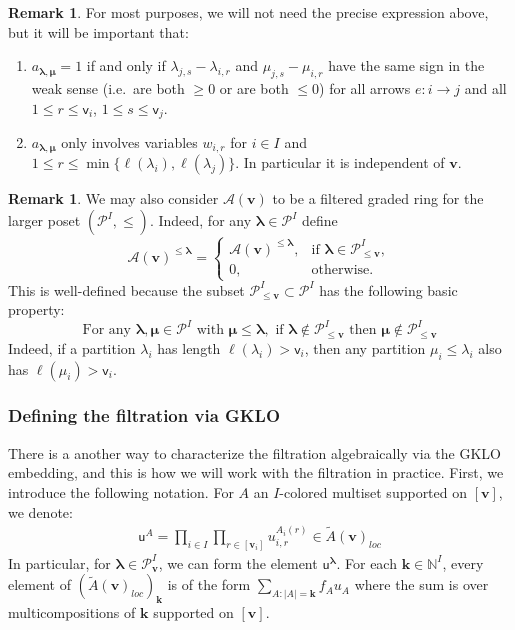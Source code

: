 \documentclass[11pt,reqno]{amsart}
\renewcommand{\mathbf}{\mathbold}
\numberwithin{equation}{section}
\theoremstyle{definition}
\newtheorem{Remark}[equation]{Remark}
\newcommand{\cA}{\mathcal{A}}
\newcommand{\cP}{\mathcal{P}}
\newcommand{\bk}{\mathbf{k}}
\newcommand{\bv}{\mathbf{v}}
\newcommand{\NN}{\mathbb{N}}
\renewcommand{\tilde}[1]{\widetilde{#1}}
\renewcommand{\bv}{\mathbf{v}} %
\newcommand{\sv}{\mathsf{v}}
\newcommand{\sfu}{\mathsf{u}}
\newcommand{\vertexset}{I}
\newcommand{\Partitions}{\cP}
\newcommand{\la}{\lambda}
\newcommand{\bla}{{\boldsymbol{\lambda}}}
\newcommand{\bmu}{{\boldsymbol{\mu}}}
\newcommand{\qzast}{\cA}
\newcommand{\GKLO}[1]{\tilde{A}(#1)_{loc}}
\begin{document}
\begin{Remark}
    \label{rmk:aproperties}
    For most purposes, we will not need the precise expression above, but it will be important that:
    \begin{enumerate}
        \item $a_{\bla,\bmu} = 1$ if and only if $\la_{j,s} - \la_{i,r}$ and $\mu_{j,s} - \mu_{i,r}$ have the same sign in the weak sense (i.e.~are both $\geq 0$ or are both $\leq 0$) for all arrows $e:i\rightarrow j$ and all $1\leq r \leq \sv_i$, $1 \leq s\leq \sv_j$.

        \item $a_{\bla,\bmu}$ only involves variables $w_{i,r}$ for $i\in \vertexset$ and $1\leq r \leq \min\{\ell(\lambda_i), \ell(\lambda_j)\}$. In particular it is independent of $\bv$.
    \end{enumerate}
\end{Remark}


\begin{Remark}
\label{rmk: filtration by all partitions}
We  may also consider $\qzast(\bv)$ to be a filtered graded ring for the larger poset $(\Partitions^{\vertexset}, \leq)$.  Indeed, for any $\bla \in \Partitions^{\vertexset}$ define
$$
\qzast(\bv)^{\leq \bla} = \left\{ \begin{array}{cl} \qzast(\bv)^{\leq \bla},& \text{if } \bla \in \Partitions_{\leq \bv}^{\vertexset}, \\ 0, & \text{otherwise.} \end{array} \right.
$$
This is well-defined because the subset $\Partitions_{\leq \bv}^\vertexset \subset \Partitions^{\vertexset}$ has the following basic property:
\begin{equation}
\label{eq: partitions length decreases under dominance}
\text{For any } \bla, \bmu \in \Partitions^\vertexset \text{ with } \bmu \leq \bla, \text{ if } \bla \notin \Partitions_{\leq \bv}^\vertexset \text{ then } \bmu \notin \Partitions_{\leq \bv}^{\vertexset}
\end{equation}
Indeed, if a partition $\la_i$ has length $\ell(\lambda_i)> \sv_i$, then any partition $\mu_i \leq \la_i$ also has $\ell(\mu_i)>\sv_i$.
\end{Remark}

\subsubsection{Defining the filtration via GKLO}

There is a another way to characterize the filtration algebraically via the GKLO embedding, and this is how we will work with the filtration in practice.
First, we introduce the following notation. For $A$ an $I$-colored multiset supported on $[\bv]$, we denote: 
\begin{align}
  \label{eq:14}
  \sfu^A = \prod_{i \in I} \prod_{r \in [\bv_i]} u_{i,r}^{A_i(r)} \in \GKLO{\bv}
\end{align}
In particular, for $\bla \in \Partitions^\vertexset_{\bv}$, we can form the element $\sfu^\bla$.
For each $\bk \in \NN^I$, every element of $\left(\GKLO{\bv}\right)_{\bk}$ is of the form
    $\sum_{A: |A| = \bk} f_A u_A$
where the sum is over multicompositions of $\bk$ supported on $[\bv]$.
\end{document}
